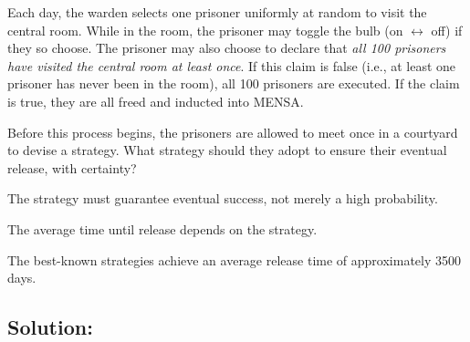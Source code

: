 \documentclass[11pt, a4paper, oneside]{article}
\newcommand{\solution}[1][]{\subsection*{#1}\hfill \par}
\theoremstyle{remark}
\theoremstyle{lemma}
\begin{document}
Each day, the warden selects one prisoner uniformly at random to visit the central room. While in the room, the prisoner may toggle the bulb (on $\leftrightarrow$ off) if they so choose. The prisoner may also choose to declare that \textit{all 100 prisoners have visited the central room at least once}. If this claim is false (i.e., at least one prisoner has never been in the room), all 100 prisoners are executed. If the claim is true, they are all freed and inducted into MENSA.

Before this process begins, the prisoners are allowed to meet once in a courtyard to devise a strategy. What strategy should they adopt to ensure their eventual release, with certainty?

The strategy must guarantee eventual success, not merely a high probability.

The average time until release depends on the strategy.

The best-known strategies achieve an average release time of approximately 3500 days.


\solution[Solution:]
\end{document}
